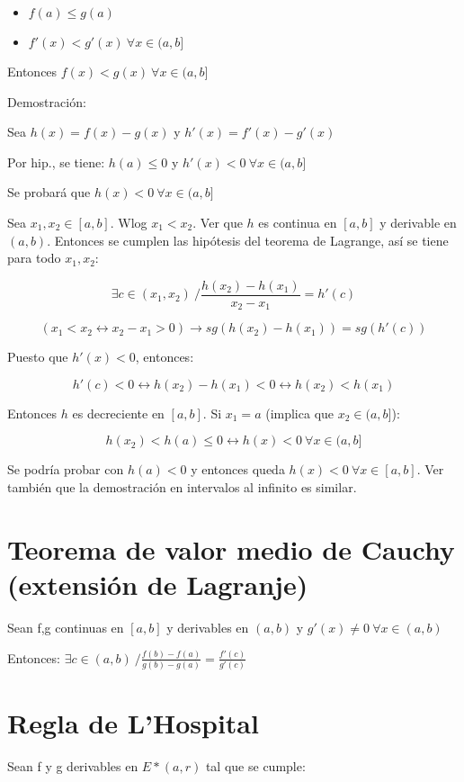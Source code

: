 \documentclass{report}
\begin{document}
		\begin{itemize}
			\item $f(a)\leq g(a)$
			\item $f'(x) < g'(x) \ \forall x \in (a,b]$
		\end{itemize}
	
		Entonces $f(x)<g(x) \ \forall x \in (a,b]$
		
		Demostración: 
		
		Sea $h(x)=f(x)-g(x)$ y $h'(x)=f'(x)-g'(x)$
		
		Por hip., se tiene: $h(a) \leq 0$ y $h'(x) < 0 \ \forall x \in (a,b]$
		
		Se probará que $h(x)<0 \ \forall x \in (a,b]$
		
		Sea $x_1,x_2 \in [a,b]$. Wlog $x_1<x_2$. Ver que $h$ es continua en $[a,b]$ y derivable en $(a,b)$. Entonces se cumplen las hipótesis del teorema de Lagrange, así se tiene para todo $x_1,x_2$:
		
			$$\exists c \in (x_1,x_2) \ / \frac{h(x_2)-h(x_1)}{x_2-x_1} = h'(c)$$
		
			$$(x_1<x_2 \leftrightarrow x_2-x_1>0) \rightarrow sg(h(x_2)-h(x_1))=sg(h'(c))$$
			
		Puesto que $h'(x) < 0$, entonces:
		
			$$h'(c) < 0 \leftrightarrow h(x_2)-h(x_1) < 0 \leftrightarrow h(x_2) < h(x_1)$$ 
			
		Entonces $h$ es decreciente en $[a,b]$. Si $x_1=a$ (implica que $x_2 \in (a,b]$):
		
			$$h(x_2)<h(a)\leq 0 \leftrightarrow h(x)<0 \ \forall x \in (a,b]$$
		
		Se podría probar con $h(a)<0$ y entonces queda $h(x)<0 \ \forall x \in [a,b]$. Ver también que la demostración en intervalos al infinito es similar.
		
	\section{Teorema de valor medio de Cauchy (extensión de Lagranje)}	
		Sean f,g continuas en $[a,b]$ y derivables en $(a,b)$ y $g'(x) \neq 0 \ \forall x \in (a,b)$
		
		Entonces: $\exists c \in (a,b) \ / \frac{f(b)-f(a)}{g(b)-g(a)} = \frac{f'(c)}{g'(c)}$
		
	\section{Regla de L'Hospital}
		Sean f y g derivables en $E*(a,r)$ tal que se cumple:
		
\end{document}
